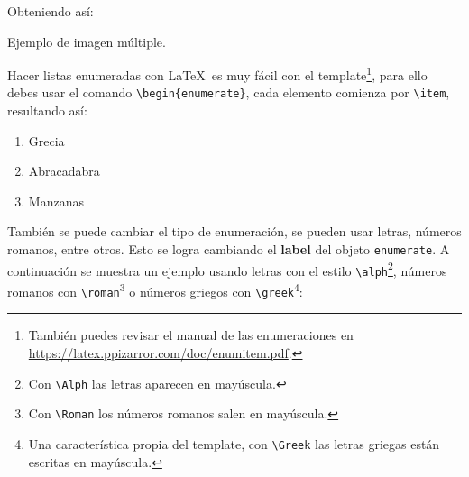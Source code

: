	Obteniendo así:

	\begin{images}{Ejemplo de imagen múltiple.}
		\imagesnewline
	\end{images}


\clearpage
{}


	Hacer listas enumeradas con \LaTeX\ es muy fácil con el template\footnote{También puedes revisar el manual de las enumeraciones en \url{https://latex.ppizarror.com/doc/enumitem.pdf}.}, para ello debes usar el comando \texttt{\textbackslash begin\{enumerate\}}, cada elemento comienza por \texttt{\textbackslash item}, resultando así:

	\begin{enumerate}
		\item Grecia
		\item Abracadabra
		\item Manzanas
	\end{enumerate}

	También se puede cambiar el tipo de enumeración, se pueden usar letras, números romanos, entre otros. Esto se logra cambiando el \textbf{label} del objeto \texttt{enumerate}. A continuación se muestra un ejemplo usando letras con el estilo \texttt{\textbackslash alph}\footnote{Con \texttt{\textbackslash Alph} las letras aparecen en mayúscula.}, números romanos con \texttt{\textbackslash roman}\footnote{Con \texttt{\textbackslash Roman} los números romanos salen en mayúscula.} o números griegos con \texttt{\textbackslash greek}\footnote{Una característica propia del template, con \texttt{\textbackslash Greek} las letras griegas están escritas en mayúscula.}:

